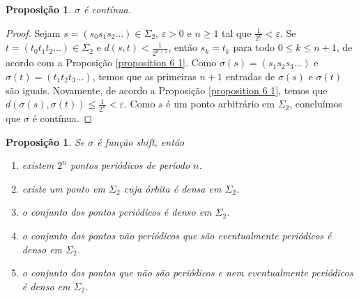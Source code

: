 \documentclass[a4paper, 12pt]{article}
\theoremstyle{definition}
\theoremstyle{plain}
\newtheorem{proposition}[definition]{Proposição}
\theoremstyle{plain}
\theoremstyle{plain}
\theoremstyle{definition}
\theoremstyle{remark}
\begin{document}
\begin{proposition}
$\sigma$ é contínua.
\end{proposition}

\begin{proof}
Sejam $s = (s_0s_1s_2\dots) \in \Sigma_2$, $\varepsilon > 0$ e $n \geq 1$ tal que $\frac{1}{2^n} < \varepsilon$. Se $t = (t_0t_1t_2\dots) \in \Sigma_ 2$ e $d(s, t) < \frac{1}{2^{n+1}}$, então $s_k = t_k$ para todo $0 \leq k \leq n+1$, de acordo com a Proposição  \ref{proposition 6 1}. Como $\sigma(s) = (s_1s_2s_3\dots)$ e $\sigma(t) = (t_1t_2t_3\dots)$, temos que as primeiras $n+1$ entradas de $\sigma(s)$ e $\sigma(t)$ são iguais. Novamente, de acordo a Proposição \ref{proposition 6 1}, temos que $d(\sigma(s), \sigma(t)) \leq \frac{1}{2^n} < \varepsilon$. Como $s$ é um ponto arbitrário em $\Sigma_2$, concluímos que $\sigma$ é contínua.
\end{proof}

\begin{proposition}
Se $\sigma$ é função shift, então
\begin{enumerate}
\item existem $2^n$ pontos periódicos de período $n$.
\item existe um ponto em $\Sigma_2$ cuja órbita é densa em $\Sigma_2$.
\item o conjunto dos pontos periódicos é denso em $\Sigma_2$.
\item o conjunto dos pontos não periódicos que são eventualmente periódicos é denso em $\Sigma_2$.
\item o conjunto dos pontos que não são periódicos e nem eventualmente periódicos é denso em $\Sigma_2$.
\end{enumerate}
\end{proposition}
\end{document}
